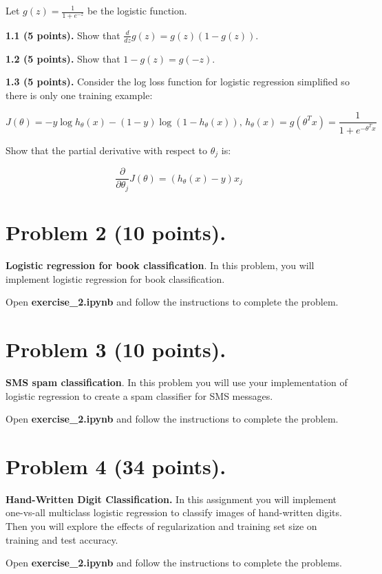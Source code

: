 \documentclass{article}
\begin{document}
\noindent Let $g(z)=\frac{1}{1+e^{-z}}$ be the logistic function. 

{\bf 1.1 (5 points).} Show that $\frac{d}{dz}g(z)=g(z)(1-g(z))$.

{\bf 1.2 (5 points).} Show that $1-g(z)=g(-z)$. 

{\bf 1.3 (5 points).} Consider the log loss function for logistic regression simplified so there is only one training example: 

$$J(\theta)=-y\log h_\theta (x)- (1-y)\log (1-h_\theta (x))\text{, } h_\theta (x)=g(\theta^T x)=\frac{1}{1+e^{-\theta^T x}}$$

\noindent Show that the partial derivative with respect to $\theta_j$ is:

$$\frac{\partial}{\partial \theta_j} J(\theta)= (h_\theta(x)-y)x_j$$


\section*{Problem 2 (10 points).} {\bf Logistic regression for book classification}. In this problem, you will implement logistic regression for book classification. 

Open \textbf{exercise\_2.ipynb} and follow the instructions to complete the problem.

\section*{Problem 3 (10 points).} {\bf SMS spam classification}. In this problem you will use your implementation of logistic regression to create a spam classifier for SMS messages. 

Open \textbf{exercise\_2.ipynb} and follow the instructions to complete the problem.



\section*{Problem 4 (34 points).} \textbf{Hand-Written Digit Classification.} In this assignment you will implement one-vs-all multiclass logistic regression to classify images of hand-written
digits. Then you will explore the effects of regularization and training set size on training and test accuracy.

Open \textbf{exercise\_2.ipynb} and follow the instructions to complete the problems.
\end{document}
